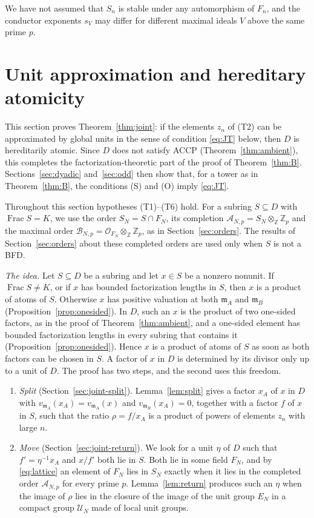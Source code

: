 \documentclass[11pt]{article}
\theoremstyle{plain}
\theoremstyle{definition}
\theoremstyle{remark}
\DeclareMathOperator{\Frac}{Frac}
\newcommand{\Z}{\mathbb Z}
\newcommand{\OO}{\mathcal O}
\newcommand{\EA}{\mathfrak m_A}
\newcommand{\EB}{\mathfrak m_B}
\begin{document}
We have not assumed that $S_n$ is stable under any automorphism of
$F_n$, and the conductor exponents $s_V$ may differ for different maximal
ideals $V$ above the same prime $p$.

\section{Unit approximation and hereditary atomicity}\label{sec:joint}

This section proves Theorem~\ref{thm:joint}: if the elements $z_n$ of
(T2) can be approximated by global units in the sense of condition
\eqref{eq:JT} below, then $D$ is hereditarily atomic.  Since $D$ does not
satisfy ACCP (Theorem~\ref{thm:ambient}), this completes the
factorization-theoretic part of the proof of Theorem~\ref{thm:B}.
Sections~\ref{sec:dyadic} and~\ref{sec:odd} then show that, for a tower as
in Theorem~\ref{thm:B}, the conditions (S) and (O) imply \eqref{eq:JT}.

Throughout this section hypotheses (T1)--(T6) hold.  For a subring
$S\subseteq D$ with $\Frac S=K$, we use the order $S_N=S\cap F_N$, its
completion
$\mathcal A_{N,p}=S_N\otimes_\Z\Z_p$ and the maximal order
$\mathcal B_{N,p}=\OO_{F_N}\otimes_\Z\Z_p$, as in
Section~\ref{sec:orders}.  The results of Section~\ref{sec:orders} about
these completed orders are used only when $S$ is not a BFD.

\emph{The idea.}  Let $S\subseteq D$ be a subring and let $x\in S$ be a
nonzero nonunit.  If $\Frac S\ne K$, or if $x$ has bounded factorization
lengths in $S$, then $x$ is a product of atoms of $S$.  Otherwise $x$ has
positive valuation at both $\EA$ and $\EB$
(Proposition~\ref{prop:onesided}).  In $D$, such an $x$ is the product of
two one-sided factors, as in the proof of Theorem~\ref{thm:ambient}, and a
one-sided element has bounded factorization lengths in every subring that
contains it (Proposition~\ref{prop:onesided}).  Hence $x$ is a product of
atoms of $S$ as soon as both factors can be chosen in $S$.  A factor of $x$
in $D$ is determined by its divisor only up to a unit of $D$.  The proof
has two steps, and the second uses this freedom.
\begin{enumerate}
\item[(1)] \emph{Split} (Section~\ref{sec:joint-split}).
Lemma~\ref{lem:split} gives a factor $x_A$ of $x$ in $D$ with
$v_{\EA}(x_A)=v_{\EA}(x)$ and $v_{\EB}(x_A)=0$, together with a factor $f$
of $x$ in $S$, such that the ratio $\rho=f/x_A$ is a product of powers of
elements $z_n$ with large $n$.
\item[(2)] \emph{Move} (Section~\ref{sec:joint-return}).  We look for a
unit $\eta$ of $D$ such that $f'=\eta^{-1}x_A$ and $x/f'$ both lie in
$S$.  Both lie in some field $F_N$, and by \eqref{eq:lattice} an element
of $F_N$ lies in $S_N$ exactly when it lies in the completed order
$\mathcal A_{N,p}$ for every prime $p$.  Lemma~\ref{lem:return} produces
such an $\eta$ when the image of $\rho$ lies in the closure of the image of
the unit group $E_N$ in a compact group $\mathcal U_N$ made of local unit
groups.
\end{enumerate}
\end{document}
